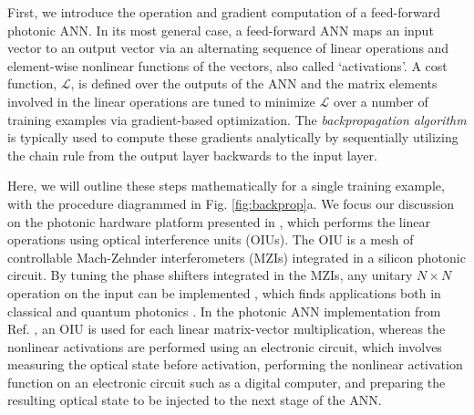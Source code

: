 First, we introduce the operation and gradient computation of a feed-forward photonic ANN.  In its most general case, a feed-forward ANN maps an input vector to an output vector via an alternating sequence of linear operations and element-wise nonlinear functions of the vectors, also called `activations'.  A cost function, $\mathcal{L}$, is defined over the outputs of the ANN and the matrix elements involved in the linear operations are tuned to minimize $\mathcal{L}$ over a number of training examples via gradient-based optimization.  The \textit{backpropagation algorithm} is typically used to compute these gradients analytically by sequentially utilizing the chain rule from the output layer backwards to the input layer.

Here, we will outline these steps mathematically for a single training example, with the procedure diagrammed in Fig. \ref{fig:backprop}a.  We focus our discussion on the photonic hardware platform presented in \cite{Shen2017}, which performs the linear operations using optical interference units (OIUs).  The OIU is a mesh of controllable Mach-Zehnder interferometers (MZIs) integrated in a silicon photonic circuit. By tuning the phase shifters integrated in the MZIs, any unitary $N \times N$ operation on the input can be implemented \cite{Reck1994,Clements2016}, which finds applications both in classical and quantum photonics \cite{Carolan2015, Harris2017}.  In the photonic ANN implementation from Ref. \cite{Shen2017}, an OIU is used for each linear matrix-vector multiplication, whereas the nonlinear activations are performed using an electronic circuit, which involves measuring the optical state before activation, performing the nonlinear activation function on an electronic circuit such as a digital computer, and preparing the resulting optical state to be injected to the next stage of the ANN.

